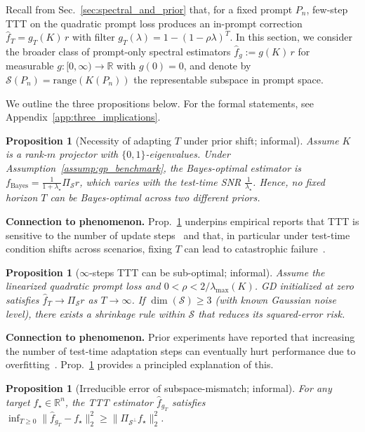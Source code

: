 \documentclass{article}
\theoremstyle{plain}
\newtheorem{proposition}[theorem]{Proposition}
\theoremstyle{definition}
\theoremstyle{remark}
\begin{document}
Recall from Sec.~\ref{sec:spectral_and_prior} that, for a fixed prompt $P_n$, few-step TTT on the quadratic prompt loss produces an in-prompt correction $\hat f_T = g_T(K)\,r$ with filter $g_T(\lambda)=1-(1-\rho\lambda)^T$. In this section, we consider the broader class of prompt-only spectral estimators $\hat f_g := g(K)\,r$ for measurable $g:[0,\infty)\to\mathbb{R}$ with $g(0)=0$, and denote by $\mathcal{S}(P_n)=\mathrm{range}(K(P_n))$ the representable subspace in prompt space.

We outline the three propositions below. For the formal statements, see Appendix~\ref{app:three_implications}.

\begin{proposition}[Necessity of adapting $T$ under prior shift; informal]\label{prop:implication_prior_shift_informal}
Assume $K$ is a rank-$m$ projector with $\{0,1\}$-eigenvalues. Under Assumption~\ref{assump:gp_benchmark}, the Bayes-optimal estimator is $f_{\mathrm{Bayes}}=\frac{1}{1+\lambda_\star}\Pi_{\mathcal S}r$, which varies with the test-time SNR $\tfrac{1}{\lambda_\star}$. Hence, no fixed horizon $T$ can be Bayes-optimal across two different priors.
\end{proposition}

\textbf{Connection to phenomenon.}
Prop.~\ref{prop:implication_prior_shift_informal} underpins empirical reports that TTT is sensitive to the number of update steps~\citep{akyurek2025the,pmlr-v202-zhao23d} and that, in particular under test-time condition shifts across scenarios, fixing $T$ can lead to catastrophic failure~\citep{Boudiaf_2022_CVPR}.

\begin{proposition}[$\infty$-steps TTT can be sub-optimal; informal]
\label{prop:implication_stein_informal}
Assume the linearized quadratic prompt loss and $0<\rho<2/\lambda_{\max}(K)$. GD initialized at zero satisfies $\hat f_T\to \Pi_{\mathcal S}r$ as $T\to \infty$. If $\dim(\mathcal{S})\ge 3$ (with known Gaussian noise level), there exists a shrinkage rule within $\mathcal{S}$ that reduces its squared-error risk.
\end{proposition}

\textbf{Connection to phenomenon.}  Prior experiments have reported that increasing the number of test-time adaptation steps can eventually hurt performance due to overfitting~\citep{pmlr-v202-zhao23d,alfarra2025testtime}. Prop.~\ref{prop:implication_stein_informal} provides a principled explanation of this.

\begin{proposition}[Irreducible error of subspace-mismatch; informal]
\label{prop:implication_subspace_informal}
For any target $f_\star\in\mathbb R^n$, the TTT estimator $\hat f_{g_T}$ satisfies $\inf_{T\ge 0}\|\hat f_{g_T}-f_\star\|_2^2 \ge \|\Pi_{\mathcal{S}^\perp}f_\star\|_2^2$.
\end{proposition}
\end{document}
